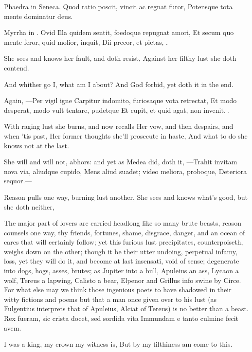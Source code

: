 {Phaedra in Seneca.
Quod ratio poscit, vincit ac regnat furor,
Potensque tota mente dominatur deus.

Myrrha in . Ovid
Illa quidem sentit, foedoque repugnat amori,
Et secum quo mente feror, quid molior, inquit,
Dii precor, et pietas, \etc{}.


She sees and knows her fault, and doth resist,
Against her filthy lust she doth contend.

And whither go I, what am I about?
And God forbid, yet doth it in the end.

Again,
---Per vigil igne
Carpitur indomito, furiosaque vota retrectat,
Et modo desperat, modo vult tentare, pudetque
Et cupit, et quid agat, non invenit, \etc{}.

With raging lust she burns, and now recalls
Her vow, and then despairs, and when 'tis past,
Her former thoughts she'll prosecute in haste,
And what to do she knows not at the last.

She will and will not, abhors: and yet as Medea did, doth it,
---Trahit invitam nova via, aliudque cupido,
Mens aliud suadet; video meliora, proboque,
Deteriora sequor.---

Reason pulls one way, burning lust another,
She sees and knows what's good, but she doth neither,


The major part of lovers are carried headlong like so many brute
beasts, reason counsels one way, thy friends, fortunes, shame,
disgrace, danger, and an ocean of cares that will certainly follow; yet
this furious lust precipitates, counterpoiseth, weighs down on the
other; though it be their utter undoing, perpetual infamy, loss, yet
they will do it, and become at last insensati, void of sense;
degenerate into dogs, hogs, asses, brutes; as Jupiter into a bull,
Apuleius an ass, Lycaon a wolf, Tereus a lapwing, Calisto a bear,
Elpenor and Grillus info swine by Circe. For what else may we think
those ingenious poets to have shadowed in their witty fictions and
poems but that a man once given over to his lust (as Fulgentius
interprets that of Apuleius, Alciat of Tereus) is no better than a
beast.
Rex fueram, sic crista docet, sed sordida vita
Immundam e tanto culmine fecit avem.

I was a king, my crown my witness is,
But by my filthiness am come to this.

}
